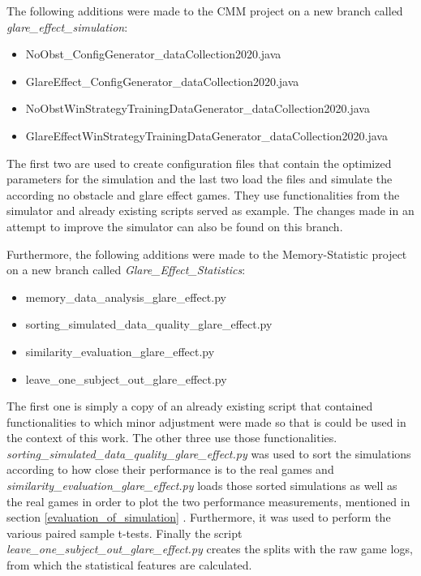 The following additions were made to the CMM project on a new branch called \textit{glare\_effect\_simulation}:
\begin{itemize}
	\item NoObst\_ConfigGenerator\_dataCollection2020.java
	\item GlareEffect\_ConfigGenerator\_dataCollection2020.java
	\item NoObstWinStrategyTrainingDataGenerator\_dataCollection2020.java
	\item GlareEffectWinStrategyTrainingDataGenerator\_dataCollection2020.java
\end{itemize}
The first two are used to create configuration files that contain the optimized parameters for the simulation and the last two load the files and simulate the according no obstacle and glare effect games. They use functionalities from the simulator and already existing scripts served as example. The changes made in an attempt to improve the simulator can also be found on this branch. 

Furthermore, the following additions were made to the Memory-Statistic project on a new branch called \textit{Glare\_Effect\_Statistics}: 
\begin{itemize}
	\item memory\_data\_analysis\_glare\_effect.py
	\item sorting\_simulated\_data\_quality\_glare\_effect.py
	\item similarity\_evaluation\_glare\_effect.py
	\item leave\_one\_subject\_out\_glare\_effect.py
\end{itemize}
The first one is simply a copy of an already existing script that contained functionalities to which minor adjustment were made so that is could be used in the context of this work. The other three use those functionalities.\\ \textit{sorting\_simulated\_data\_quality\_glare\_effect.py} was used to sort the simulations according to how close their performance is to the real games and\\ \textit{similarity\_evaluation\_glare\_effect.py} loads those sorted simulations as well as the real games in order to plot the two performance measurements, mentioned in section \ref{evaluation_of_simulation} . Furthermore, it was used to perform the various paired sample t-tests. Finally the script \textit{leave\_one\_subject\_out\_glare\_effect.py} creates the splits with the raw game logs, from which the statistical features are calculated. 

